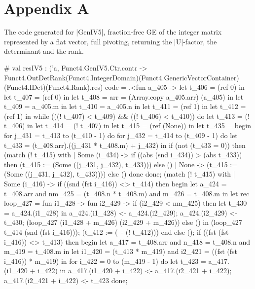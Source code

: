 \documentclass{llncs}
\begin{document}
\section{Appendix A}
The code generated for |GenIV5|, fraction-free GE of the integer matrix
represented by a flat vector, full pivoting, returning the |U|-factor,
the determinant and the rank.
\begin{code}
# val resIV5 :
  ('a,
   Funct4.GenIV5.Ctr.contr ->
   Funct4.OutDetRank(Funct4.IntegerDomain)(Funct4.GenericVectorContainer)
                    (Funct4.IDet)(Funct4.Rank).res)
  code =
  .<fun a_405 ->
   let t_406 = (ref 0) in
   let t_407 = (ref 0) in
   let t_408 = {arr = (Array.copy a_405.arr)} (a_405) in
   let t_409 = a_405.m in
   let t_410 = a_405.n in
   let t_411 = (ref 1) in
   let t_412 = (ref 1) in
   while (((! t_407) < t_409) && ((! t_406) < t_410)) do
    let t_413 = (! t_406) in
    let t_414 = (! t_407) in
    let t_415 = (ref (None)) in
    let t_435 =
     begin
      for j_431 = t_413 to (t_410 - 1) do
       for j_432 = t_414 to (t_409 - 1) do
        let t_433 = (t_408.arr).((j_431 * t_408.m) + j_432) in
        if (not (t_433 = 0)) then
         (match (! t_415) with
          | Some (i_434) ->
             if ((abs (snd i_434)) > (abs t_433)) then
              (t_415 := (Some ((j_431, j_432), t_433)))
             else ()
          | None -> (t_415 := (Some ((j_431, j_432), t_433))))
        else ()
       done
      done;
      (match (! t_415) with
       | Some (i_416) ->
          if ((snd (fst i_416)) <> t_414) then begin
           let a_424 = t_408.arr
           and nm_425 = (t_408.n * t_408.m)
           and m_426 = t_408.m in
           let rec loop_427 =
            fun i1_428 ->
             fun i2_429 ->
              if (i2_429 < nm_425) then
               let t_430 = a_424.(i1_428) in
               a_424.(i1_428) <- a_424.(i2_429);
               a_424.(i2_429) <- t_430;
               (loop_427 (i1_428 + m_426) (i2_429 + m_426))
              else () in
           (loop_427 t_414 (snd (fst i_416)));
           (t_412 := (~- (! t_412)))
          end else ();
          if ((fst (fst i_416)) <> t_413) then begin
           let a_417 = t_408.arr
           and n_418 = t_408.n
           and m_419 = t_408.m in
           let i1_420 = (t_413 * m_419)
           and i2_421 = ((fst (fst i_416)) * m_419) in
           for i_422 = 0 to (m_419 - 1) do
            let t_423 = a_417.(i1_420 + i_422) in
            a_417.(i1_420 + i_422) <- a_417.(i2_421 + i_422);
            a_417.(i2_421 + i_422) <- t_423
           done;

\end{code}
\end{document}
